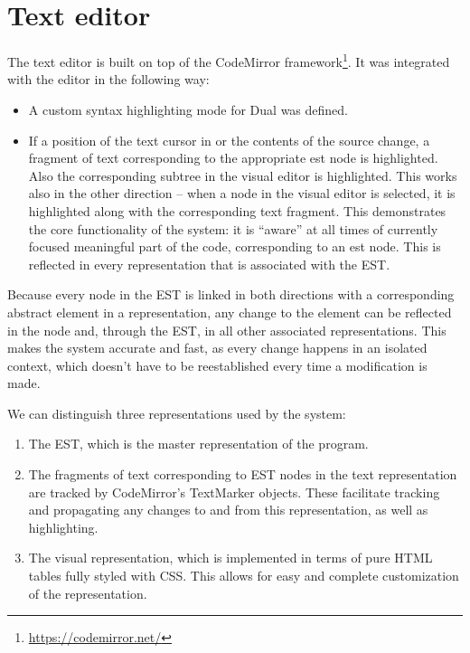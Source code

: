 \section{Text editor}
The text editor is built on top of the CodeMirror
framework\footnote{\url{https://codemirror.net/}}. It was integrated with the
editor in the following way:
\begin{itemize}
    \item A custom syntax highlighting mode for Dual was defined.  %
    \item If a position of the text cursor in or the contents of the source
      change, a fragment of text corresponding to the appropriate \acrshort{est}
      node is highlighted. Also the corresponding subtree in the visual editor
      is highlighted. This works also in the other direction -- when a node in
      the visual editor is selected, it is highlighted along with the
      corresponding text fragment. This demonstrates the core functionality of
      the system: it is ``aware'' at all times of currently focused meaningful
      part of the code, corresponding to an \acrshort{est} node. This is
      reflected in every representation that is associated with the EST.

\end{itemize}
Because every node in the EST is linked in both directions with a corresponding
abstract element in a representation, any change to the element can be reflected
in the node and, through the EST, in all other associated representations. This
makes the system accurate and fast, as every change happens in an isolated
context, which doesn't have to be reestablished every time a modification is
made.

We can distinguish three representations used by the system:
\begin{enumerate}
    \item The EST, which is the master representation of the program.
    \item The fragments of text corresponding to EST nodes in the text
      representation are tracked by CodeMirror's TextMarker objects. These
      facilitate tracking and propagating any changes to and from this
      representation, as well as highlighting.
    \item The visual representation, which is implemented in terms of pure HTML
      tables fully styled with CSS. This allows for easy and complete
      customization of the representation.
\end{enumerate}

